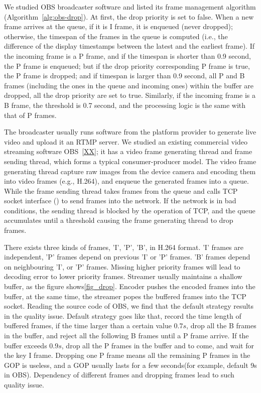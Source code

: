 We studied OBS broadcaster software and listed its frame management algorithm (Algorithm~\ref{alg:obs-drop}). At first, the drop priority is set to false. When a new frame arrives at the queue, if it is I frame, it is enqueued (never dropped); otherwise, the timespan of the frames in the queue is computed (i.e., the difference of the display timestamps between the latest and the earliest frame). If the incoming frame is a P frame, and if the timespan is shorter than 0.9 second, the P frame is enqueued; but if the drop priority corresponding P frame is true, the P frame is dropped; and if timespan is larger than 0.9 second, all P and B frames (including the ones in the queue and incoming ones) within the buffer are dropped, all the drop priority are set to true. Similarly, if the incoming frame is a B frame, the threshold is 0.7 second, and the processing logic is the same with that of P frames.

\iffalse

The broadcaster usually runs software from the platform provider to generate live video and upload it an RTMP server. We studied an existing commercial video streaming software OBS~\ref{XX}; it has a video frame generating thread and frame sending thread, which forms a typical consumer-producer model. The video frame generating thread capture raw images from the device camera and encoding them into video frames (e.g., H.264), and enqueue the generated frames into a queue. While the frame sending thread takes frames from the queue and calls TCP socket interface (\mywrite) to send frames into the network. If the network is in bad conditions, the sending thread is blocked by the \mywrite operation of TCP, and the queue accumulates until a threshold causing the frame generating thread to drop frames.


There exists three kinds of frames, 'I', 'P', 'B', in H.264 format. 'I' frames are independent, 'P' frames depend on previous 'I' or 'P' frames. 'B' frames depend on neighbouring 'I', or 'P' frames. Missing higher priority frames will lead to decoding error to lower priority frames.
Streamer usually maintains a shallow buffer, as the figure shows\ref{fig_drop}. Encoder pushes the encoded frames into the buffer, at the same time, the streamer popes the buffered frames into the TCP socket. Reading the source code of OBS, we find that the default strategy results in the quality issue. Default strategy goes like that, record the time length of buffered frames, if the time larger than a certain value $0.7s$, drop all the B frames in the buffer, and reject all the following B frames until a P frame arrive. If the buffer exceeds $0.9s$, drop all the P frames in the buffer and to come, and wait for the key I frame. Dropping one P frame means all the remaining P frames in the GOP is useless, and a GOP usually lasts for a few seconds(for example, default 9s in OBS). Dependency of different frames and dropping frames lead to such quality issue.

